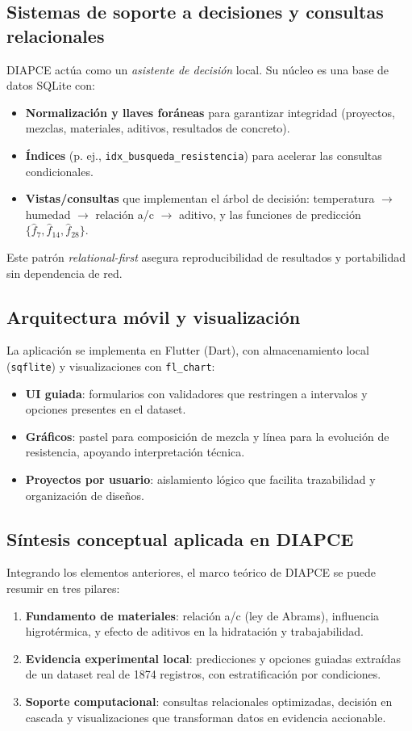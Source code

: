 \subsection{Sistemas de soporte a decisiones y consultas relacionales}
DIAPCE actúa como un \textit{asistente de decisión} local. Su núcleo es una base de datos SQLite con:
\begin{itemize}
    \item \textbf{Normalización y llaves foráneas} para garantizar integridad (proyectos, mezclas, materiales, aditivos, resultados de concreto).
    \item \textbf{Índices} (p. ej., \texttt{idx\_busqueda\_resistencia}) para acelerar las consultas condicionales.
    \item \textbf{Vistas/consultas} que implementan el árbol de decisión: 
    temperatura $\rightarrow$ humedad $\rightarrow$ relación a/c $\rightarrow$ aditivo, 
    y las funciones de predicción $\{\hat f_7,\hat f_{14},\hat f_{28}\}$.
\end{itemize}
Este patrón \textit{relational-first} asegura reproducibilidad de resultados y portabilidad sin dependencia de red.

\subsection{Arquitectura móvil y visualización}
La aplicación se implementa en Flutter (Dart), con almacenamiento local (\texttt{sqflite}) y visualizaciones con \texttt{fl\_chart}:
\begin{itemize}
    \item \textbf{UI guiada}: formularios con validadores que restringen a intervalos y opciones presentes en el dataset.
    \item \textbf{Gráficos}: pastel para composición de mezcla y línea para la evolución de resistencia, apoyando interpretación técnica.
    \item \textbf{Proyectos por usuario}: aislamiento lógico que facilita trazabilidad y organización de diseños.
\end{itemize}

\subsection{Síntesis conceptual aplicada en DIAPCE}
Integrando los elementos anteriores, el marco teórico de DIAPCE se puede resumir en tres pilares:
\begin{enumerate}
    \item \textbf{Fundamento de materiales}: relación a/c (ley de Abrams), influencia higrotérmica, y efecto de aditivos en la hidratación y trabajabilidad.
    \item \textbf{Evidencia experimental local}: predicciones y opciones guiadas extraídas de un dataset real de 1874 registros, con estratificación por condiciones.
    \item \textbf{Soporte computacional}: consultas relacionales optimizadas, decisión en cascada y visualizaciones que transforman datos en evidencia accionable.
\end{enumerate}

